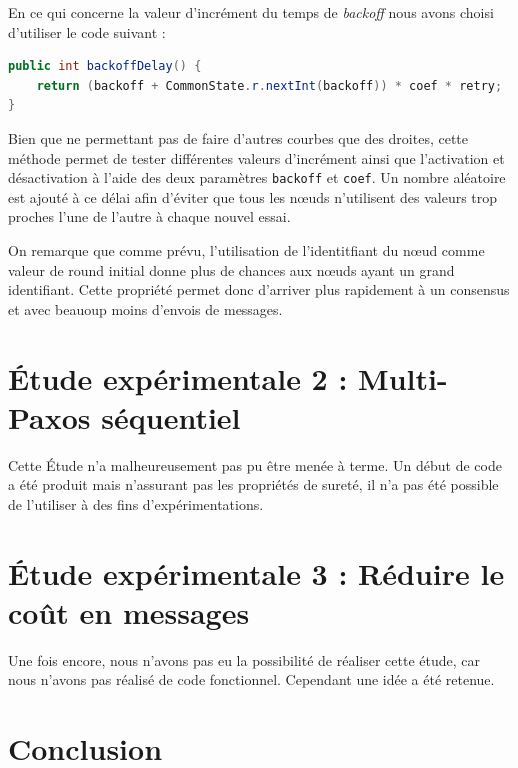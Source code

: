 \documentclass[french]{article}
\begin{document}
En ce qui concerne la valeur d'incrément du temps de \emph{backoff} nous avons choisi d'utiliser le code suivant :

\begin{lstlisting}[language=java]
public int backoffDelay() {
	return (backoff + CommonState.r.nextInt(backoff)) * coef * retry;
}
\end{lstlisting}

Bien que ne permettant pas de faire d'autres courbes que des droites, cette méthode permet de tester différentes valeurs d'incrément ainsi que l'activation et désactivation à l'aide des deux paramètres \lstinline{backoff} et \lstinline{coef}.
Un nombre aléatoire est ajouté à ce délai afin d'éviter que tous les nœuds n'utilisent des valeurs trop proches l'une de l'autre à chaque nouvel essai.



On remarque que comme prévu, l'utilisation de l'identitfiant du nœud comme valeur de round initial donne plus de chances aux nœuds ayant un grand identifiant.
Cette propriété permet donc d'arriver plus rapidement à un consensus et avec beauoup moins d'envois de messages.





\section{Étude expérimentale 2 : Multi-Paxos séquentiel}

Cette Étude n'a malheureusement pas pu être menée à terme.
Un début de code a été produit mais n'assurant pas les propriétés de sureté, il n'a pas été possible de l'utiliser à des fins d'expérimentations.

\section{Étude expérimentale 3 : Réduire le coût en messages}

Une fois encore, nous n'avons pas eu la possibilité de réaliser cette étude, car nous n'avons pas réalisé de code fonctionnel.
Cependant une idée a été retenue.

\section*{Conclusion}
\end{document}
